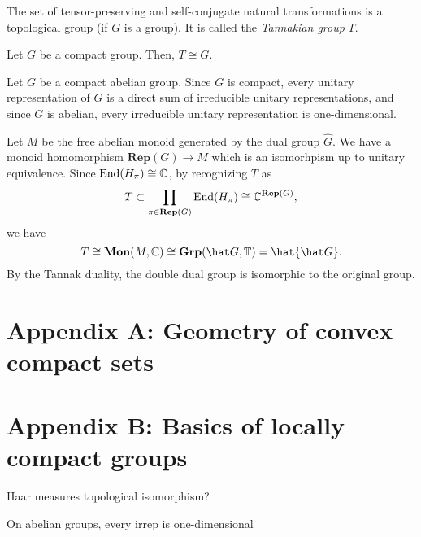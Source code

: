 \documentclass[10pt]{article}
\begin{document}
The set of tensor-preserving and self-conjugate natural transformations is a topological group (if $G$ is a group).
It is called the \emph{Tannakian group} $T$.

\begin{thm}
Let $G$ be a compact group.
Then, $T\cong G$.
\end{thm}

\begin{ex}
Let $G$ be a compact abelian group.
Since $G$ is compact, every unitary representation of $G$ is a direct sum of irreducible unitary representations, and since $G$ is abelian, every irreducible unitary representation is one-dimensional.

Let $M$ be the free abelian monoid generated by the dual group $\hat G$.
We have a monoid homomorphism $\mathbf{Rep}(G)\to M$ which is an isomorhpism up to unitary equivalence.
Since $\operatorname{End}(H_\pi)\cong\mathbb{C}$, by recognizing $T$ as
\[T\subset\prod_{\pi\in\mathbf{Rep}(G)}\operatorname{End}(H_\pi)\cong\mathbb{C}^{\mathbf{Rep}(G)},\]
we have
\[T\cong\mathbf{Mon}(M,\C)\cong\mathbf{Grp}(\hat G,\T)=\hat{\hat G}.\]
By the Tannak duality, the double dual group is isomorphic to the original group.
\end{ex}

\fi



\newpage

\section*{Appendix A: Geometry of convex compact sets}

\section*{Appendix B: Basics of locally compact groups}
Haar measures
topological isomorphism?



\begin{defn}

\end{defn}

\begin{thm}

\end{thm}

\begin{cor}
On abelian groups, every irrep is one-dimensional
\end{cor}
\end{document}
